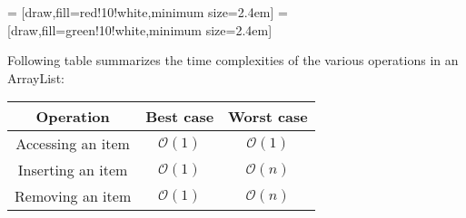  = [draw,fill=red!10!white,minimum size=2.4em]
 = [draw,fill=green!10!white,minimum size=2.4em]

\newcommand{\data}{{{12.5, 6.4, 8.5, 9.6, -3.4, 0, 0, 0},
					{6.4, 6.4, 8.5, 9.6, -3.4, 0, 0, 0},
					{6.4, 8.5, 8.5, 9.6, -3.4, 0, 0, 0},
					{6.4, 8.5, 9.6, 9.6, -3.4, 0, 0, 0},
					{6.4, 8.5, 9.6, -3.4, -3.4, 0, 0, 0},
					{6.4, 8.5, 9.6, -3.4, -3.4, 0, 0, 0}}}
\bgroup \tikzset{png export}  \egroup

\vskip 1cm

Following table summarizes the time complexities of the various operations in an ArrayList:

\Large
\begin{center}
  \begin{tabular}{c|c|c}
    Operation & Best case & Worst case\\
    \hline
    Accessing an item & \color{ForestGreen} $\mathcal{O}(1)$ \color{black} & \color{ForestGreen} $\mathcal{O}(1)$ \color{black}\\
    \hline
    Inserting an item & \color{ForestGreen} $\mathcal{O}(1)$ \color{black} & \color{red} $\mathcal{O}(n)$ \color{black} \\
    \hline
    Removing an item & \color{ForestGreen} $\mathcal{O}(1)$ \color{black} & \color{red} $\mathcal{O}(n)$ \color{black}
  \end{tabular}
\end{center}
\normalsize

